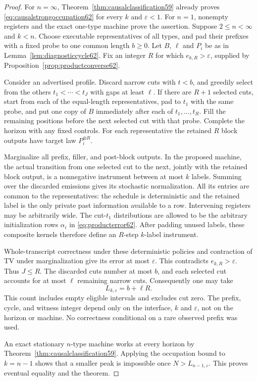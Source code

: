 \begin{proof}
For $n=\infty$, Theorem~\ref{thm:causalclassification59} already proves
\eqref{eq:causalstrongoccupation62} for every $k$ and
$\varepsilon<1$. For $n=1$, nonempty registers and the exact one-type
machine prove the assertion. Suppose $2\le n<\infty$ and $k<n$.
Choose executable representatives of all types, and pad their prefixes
with a fixed probe to one common length $b\ge0$. Let $B$, $\ell$ and
$P_i$ be as in Lemma~\ref{lem:diagnosticcycle62}. Fix an integer $R$
for which $e_{k,R}>\varepsilon$, supplied by
Proposition~\ref{prop:productconverse62}.

Consider an advertised profile. Discard narrow cuts with $t<b$, and
greedily select from the others
$t_1<\cdots<t_J$ with gaps at least $\ell$. If there are $R+1$
selected cuts, start from each of the equal-length representatives,
pad to $t_1$ with the same probe, and put one copy of $B$ immediately
after each of $t_1,\ldots,t_R$. Fill the remaining positions before
the next selected cut with that probe. Complete the horizon with any
fixed controls. For each representative the retained $R$ block outputs
have target law $P_i^{\otimes R}$.

Marginalize all prefix, filler, and post-block outputs. In the proposed
machine, the actual transition from one selected cut to the next,
jointly with the retained block output, is a nonnegative instrument
between at most $k$ labels. Summing over the discarded emissions gives
its stochastic normalization. All its entries are common to the
representatives: the schedule is deterministic and the retained label
is the only private past information available to a row. Intervening
registers may be arbitrarily wide. The cut-$t_1$ distributions are
allowed to be the arbitrary initialization rows $\alpha_i$ in
\eqref{eq:producterror62}. After padding unused labels, these composite
kernels therefore define an $R$-step $k$-label instrument.

Whole-transcript correctness under these deterministic policies and
contraction of TV under marginalization give its error at most
$\varepsilon$. This contradicts $e_{k,R}>\varepsilon$. Thus $J\le R$.
The discarded cuts number at most $b$, and each selected cut accounts
for at most $\ell$ remaining narrow cuts. Consequently one may take
\[
                         L_{k,\varepsilon}=b+\ell R.
\]
This count includes empty eligible intervals and excludes cut zero.
The prefix, cycle, and witness integer depend only on the interface,
$k$ and $\varepsilon$, not on the horizon or machine. No correctness
conditional on a rare observed prefix was used.

An exact stationary $n$-type machine works at every horizon by
Theorem~\ref{thm:causalclassification59}. Applying the occupation bound
to $k=n-1$ shows that a smaller peak is impossible once
$N>L_{n-1,\varepsilon}$. This proves eventual equality and the theorem.
\end{proof}

